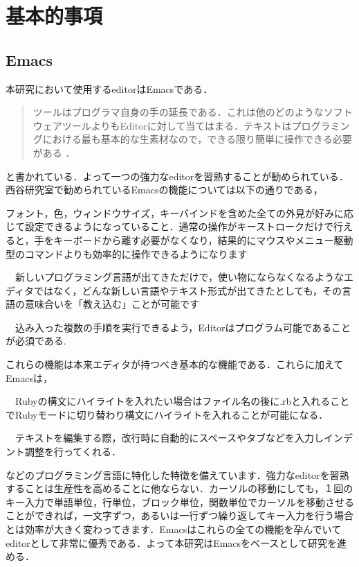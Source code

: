 \chapter{基本的事項}\label{ux57faux672cux7684ux4e8bux9805}

    \section{Emacs}\label{emacs}

    本研究において使用するeditorはEmacsである．
\begin{quotation}
ツールはプログラマ自身の手の延長である．これは他のどのようなソフトウェアツールよりもEditorに対して当てはまる．テキストはプログラミングにおける最も基本的な生素材なので，できる限り簡単に操作できる必要がある \cite{達人プログラマー}． 
\end{quotation}と書かれている．よって一つの強力なeditorを習熟することが勧められている．西谷研究室で勧められているEmacsの機能については以下の通りである，

\begin{description}
\def\labelenumi{\arabic{enumi}.}
\tightlist
\item[設定可能である] フォント，色，ウィンドウサイズ，キーバインドを含めた全ての外見が好みに応じて設定できるようになっていること．通常の操作がキーストロークだけで行えると，手をキーボードから離す必要がなくなり，結果的にマウスやメニュー駆動型のコマンドよりも効率的に操作できるようになります
\item[拡張性がある]　新しいプログラミング言語が出てきただけで，使い物にならなくなるようなエディタではなく，どんな新しい言語やテキスト形式が出てきたとしても，その言語の意味合いを「教え込む」ことが可能です
\item[プログラム可能であること]　込み入った複数の手順を実行できるよう，Editorはプログラム可能であることが必須である.
\end{description}これらの機能は本来エディタが持つべき基本的な機能である．これらに加えてEmacsは，

\begin{description}
\def\labelenumi{\arabic{enumi}.}
\tightlist
\item[構文のハイライト]　Rubyの構文にハイライトを入れたい場合はファイル名の後に.rbと入れることでRubyモードに切り替わり構文にハイライトを入れることが可能になる．
\item[自動インデント]　テキストを編集する際，改行時に自動的にスペースやタブなどを入力しインデント調整を行ってくれる．
\end{description}などのプログラミング言語に特化した特徴を備えています．強力なeditorを習熟することは生産性を高めることに他ならない．カーソルの移動にしても，１回のキー入力で単語単位，行単位，ブロック単位，関数単位でカーソルを移動させることができれば，一文字ずつ，あるいは一行ずつ繰り返してキー入力を行う場合とは効率が大きく変わってきます．Emacsはこれらの全ての機能を孕んでいてeditorとして非常に優秀である．よって本研究はEmacsをベースとして研究を進める．

